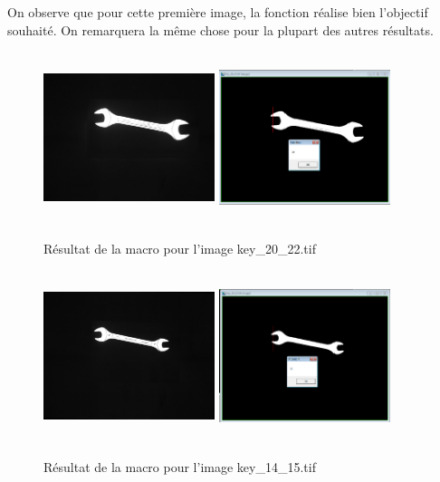 \documentclass{scrreprt}
\begin{document}
On observe que pour cette première image, la fonction réalise bien l'objectif souhaité. 
On remarquera la même chose pour la plupart des autres résultats.

\begin{figure}[!h]
\centering
\includegraphics[width=5cm, height=5cm]{images/key2022.png}\hfill
\includegraphics[width=5cm, height=5cm]{images/key20.png}
\caption{Résultat de la macro pour l'image key_20_22.tif}
\end{figure}

\newpage
\begin{figure}[!h]
\centering
\includegraphics[width=5cm, height=5cm]{images/key1415.png}\hfill
\includegraphics[width=5cm, height=5cm]{images/key15.png}
\caption{Résultat de la macro pour l'image key_14_15.tif}
\end{figure}
\end{document}
